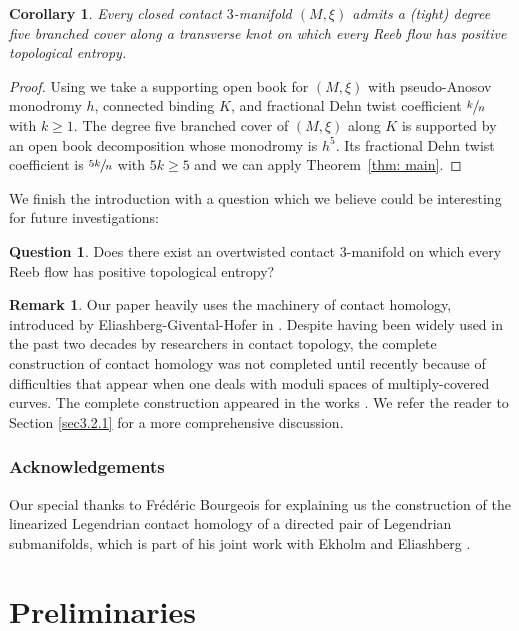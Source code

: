 \documentclass[10pt]{amsart}
\theoremstyle{plain}
\newtheorem{cor}[thm]{Corollary}
\theoremstyle{definition}
\newtheorem{q}[thm]{Question}
\newtheorem{rmk}[thm]{Remark}
\numberwithin{equation}{subsection}
\begin{document}
\begin{cor}
Every closed contact $3$-manifold $(M,\xi)$ admits a (tight) degree five branched cover along a transverse knot on which every Reeb flow has positive topological entropy.
\end{cor}

\begin{proof}
Using \cite{CH1} we take a supporting open book for $(M,\xi)$ with pseudo-Anosov monodromy $h$, connected binding $K$, and fractional Dehn twist coefficient $\sfrac{k}{n}$ with $k\geq 1$. The degree five branched cover of $(M,\xi)$ along $K$ is supported by an open book decomposition whose monodromy is $h^5$. Its fractional Dehn twist coefficient is $\sfrac{5k}{n}$ with $5k\geq 5$ and we can apply Theorem~\ref{thm: main}.
\end{proof}

We finish the introduction with a question which we believe could be interesting for future investigations:

\begin{q}
Does there exist an overtwisted contact $3$-manifold on which every Reeb flow has positive topological entropy?
\end{q}

\begin{rmk}
Our paper heavily uses the machinery of contact homology, introduced by Eliashberg-Givental-Hofer in \cite{SFT}. Despite having been widely used in the past two decades by researchers in contact topology, the complete construction of contact homology was not completed until recently because of difficulties that appear when one deals with moduli spaces of multiply-covered curves. The complete construction appeared in the works \cite{BH,Pa1,HWZ2}. We refer the reader to Section \ref{sec3.2.1} for a more comprehensive discussion.
\end{rmk}

\subsubsection*{Acknowledgements} Our special thanks to Frédéric Bourgeois for explaining us the construction of the linearized Legendrian contact homology of a directed pair of Legendrian submanifolds, which is part of his joint work with Ekholm and Eliashberg \cite{BEE}.

\section{Preliminaries}
\end{document}

